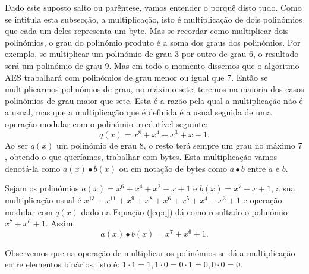 Dado este suposto salto ou parêntese, vamos entender o porquê disto tudo. Como se intitula esta subsecção, a multiplicação, isto é multiplicação de dois polinómios que cada um deles representa um byte. Mas se recordar como multiplicar dois polinómios, o grau do polinómio produto é a soma dos graus dos polinómios. Por exemplo, se multiplicar um polinómio de grau 3 por outro de grau 6, o resultado será um polinómio de grau 9. Mas em todo o momento dissemos que o algoritmo AES trabalhará com polinómios de grau menor ou igual que 7. Então se multiplicarmos polinómios de grau, no máximo sete, teremos na maioria dos casos polinómios de grau maior que sete. Esta é a razão pela qual a multiplicação não é a usual, mas que a multiplicação que é definida é a usual seguida de uma operação modular com o polinómio irredutível seguinte:
\begin{equation}\label{eq:q}
q(x)=x^8+x^4+x^3+x+1.
\end{equation}
Ao ser $q(x)$ um polinómio de grau $8$, o resto terá sempre um grau no máximo $7$, obtendo o que queríamos, trabalhar com bytes. Esta multiplicação vamos denotá-la como $a(x) \bullet b(x)$ ou em notação de bytes como $a\bullet b$ entre $a$ e $b$.
\begin{example}
Sejam os polinómios $a(x)=x^6+x^4+x^2+x+1$ e $b(x)=x^7+x+1$, a sua multiplicação usual é \mbox{$x^{13}+ x^{11}+x^9+x^8+ x^6+x^5+x^4+x^3+1$} e operação modular com $q(x)$ dado na Equação (\ref{eq:q}) dá como resultado o polinómio \mbox{$x^7+x^6+1$}. Assim,
$$
a(x)\bullet b(x)=x^7+x^6+1.
$$
\end{example}
Observemos que na operação de multiplicar os polinómios se dá a multiplicação entre elementos binários, isto é: $1 \cdot 1=1, 1 \cdot 0= 0\cdot 1= 0, 0 \cdot 0 =0$.



